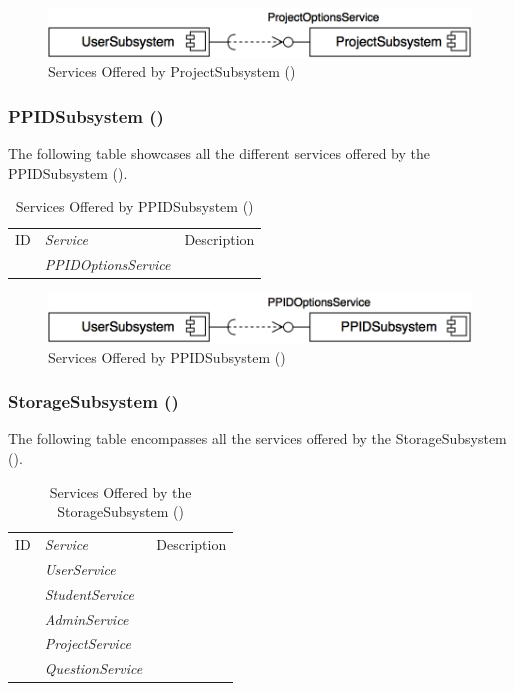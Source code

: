 \documentclass[12pt,letterpaper]{article}
\begin{document}
\begin{figure}[H]
	\centering{}
	\includegraphics[scale=0.40]{imgs/d3/services/project-subsystem.png}
	\caption{Services Offered by ProjectSubsystem ()}
\end{figure}

\subsubsection{PPIDSubsystem ()}

\noindent{}
The following table showcases all the different services offered by the PPIDSubsystem ().

\begin{table}[H]
	\caption{Services Offered by PPIDSubsystem ()} 
	\begin{tabu} to 
		\tableheader{}ID & Service & Description\\
		 & PPIDOptionsService & \\
	\end{tabu}
\end{table}

\begin{figure}[H]
	\centering{}
	\includegraphics[scale=0.40]{imgs/d3/services/ppid-subsystem.png}
	\caption{Services Offered by PPIDSubsystem ()}
\end{figure}

\subsubsection{StorageSubsystem ()}

The following table encompasses all the services offered by the StorageSubsystem (). 

\begin{table}[H]
	\caption{Services Offered by the StorageSubsystem ()} 
	\begin{tabu} to 
		\tableheader{}ID & Service & Description\\
		 & UserService & \\
		 & StudentService & \\
		 & AdminService & \\
		 & ProjectService & \\
		 & QuestionService & \\
	\end{tabu}
\end{table}
\end{document}
